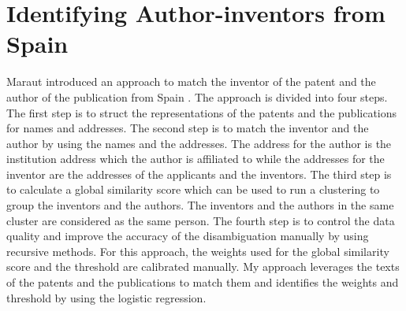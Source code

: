 \section{Identifying Author-inventors from Spain}
Maraut introduced an approach to match the inventor of the patent and the author of the publication from Spain \cite{iaifs}. The approach is divided into four steps. The first step is to struct the representations of the patents and the publications for names and addresses. The second step is to match the inventor and the author by using the names and the addresses. The address for the author is the institution address which the author is affiliated to while the addresses for the inventor are the addresses of the applicants and the inventors. The third step is to calculate a global similarity score which can be used to run a clustering to group the inventors and the authors. The inventors and the authors in the same cluster are considered as the same person. The fourth step is to control the data quality and improve the accuracy of the disambiguation manually by using recursive methods. For this approach, the weights used for the global similarity score and the threshold are calibrated manually. My approach leverages the texts of the patents and the publications to match them and identifies the weights and threshold by using the logistic regression.

